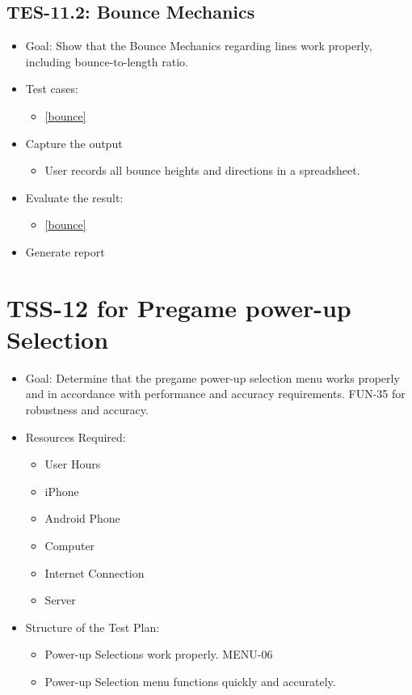 \subsection{TES-11.2: Bounce Mechanics }
\begin{itemize}
\item Goal: Show that the Bounce Mechanics regarding lines work properly, including
bounce-to-length ratio. 
\item Test cases: 

\begin{itemize}
\item \ref{bounce}
\end{itemize}
\item Capture the output
\begin{itemize}
\item User records all bounce heights and directions in a spreadsheet.
\end{itemize}
\item Evaluate the result: 
\begin{itemize}
\item \ref{bounce}
\end{itemize}
\item Generate report 
\end{itemize}




\section{TSS-12 for Pregame power-up Selection}
\begin{itemize}
\item Goal: Determine that the pregame power-up selection menu works properly and in accordance
with performance and accuracy requirements. FUN-35
for robustness and accuracy.

\item Resources Required:
\begin{itemize}
\item User Hours 
\item iPhone 
\item Android Phone 
\item Computer 
\item Internet Connection 
\item Server
\end{itemize}
\item Structure of the Test Plan: 

\begin{itemize}

\item Power-up Selections work properly. MENU-06
\item Power-up Selection menu functions quickly and accurately.
\end{itemize}
\end{itemize}

